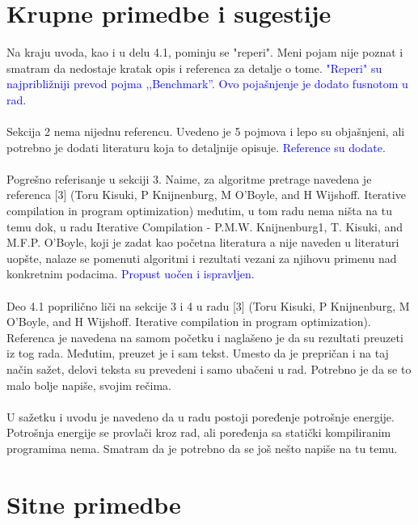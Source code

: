 \documentclass[a4paper]{report}
\newcommand{\odgovor}[1]{\textcolor{blue}{#1}}
\begin{document}
\section{Krupne primedbe i sugestije}

\label{sec: primedbe}

\noindent Na kraju uvoda, kao i u delu 4.1, pominju se "reperi". Meni pojam nije poznat i smatram da nedostaje kratak opis i referenca za detalje o tome.
\odgovor{"Reperi" su najpribližniji prevod pojma ,,Benchmark''. Ovo pojašnjenje je dodato fusnotom u rad. }
\\
\\
Sekcija 2 nema nijednu referencu. Uvedeno je 5 pojmova i lepo su objašnjeni, ali potrebno je dodati literaturu koja to detaljnije opisuje.
\odgovor{Reference su dodate. }
\\
\\
Pogrešno referisanje u sekciji 3. Naime, za algoritme pretrage navedena je referenca [3] (Toru Kisuki, P Knijnenburg, M O'Boyle, and H Wijshoff. Iterative compilation in program optimization) međutim, u tom radu nema ništa na tu temu dok, u radu Iterative Compilation - P.M.W. Knijnenburg1, T. Kisuki, and M.F.P. O'Boyle, koji je zadat kao početna literatura a nije naveden u literaturi uopšte, nalaze se pomenuti algoritmi i rezultati vezani za njihovu primenu nad konkretnim podacima.
\odgovor{Propust uočen i ispravljen.}
\\
\\
Deo 4.1 poprilično liči na sekcije 3 i 4 u radu  [3] (Toru Kisuki, P Knijnenburg, M O'Boyle, and H Wijshoff. Iterative compilation in program optimization). Referenca je navedena na samom početku i naglašeno je da su rezultati preuzeti iz tog rada. Međutim, preuzet je i sam tekst. Umesto da je prepričan i na taj način sažet, delovi teksta su prevedeni i samo ubačeni u rad. Potrebno je da se to malo bolje napiše, svojim rečima.
\\
\\
U sažetku i uvodu je navedeno da u radu postoji poređenje potrošnje energije. Potrošnja energije se provlači kroz rad, ali poređenja sa statički kompiliranim programima nema. Smatram da je potrebno da se još nešto napiše na tu temu.

\section{Sitne primedbe}
\end{document}
